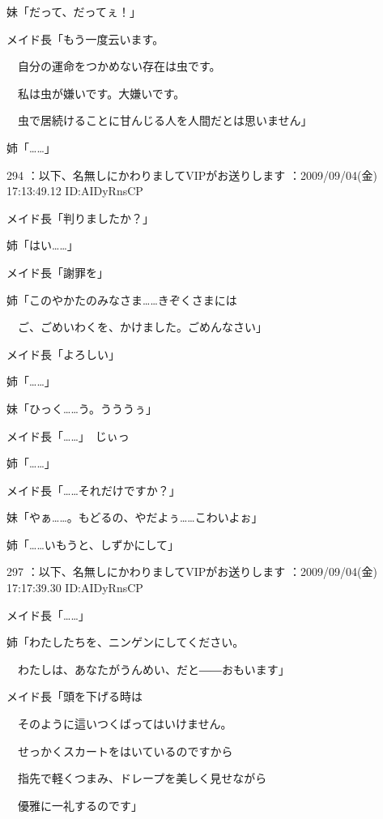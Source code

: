 \documentclass[a4j,twocolumn]{tarticle}
\begin{document}
妹「だって、だってぇ！」 



メイド長「もう一度云います。\par{} 
　自分の運命をつかめない存在は虫です。\par{} 
　私は虫が嫌いです。大嫌いです。\par{} 
　虫で居続けることに甘んじる人を人間だとは思いません」 



姉「……」 

	
    
    

294 ：以下、名無しにかわりましてVIPがお送りします ：2009/09/04(金) 17:13:49.12 ID:AIDyRnsCP 


メイド長「判りましたか？」\par{} 
姉「はい……」 



メイド長「謝罪を」 



姉「このやかたのみなさま……きぞくさまには\par{} 
　ご、ごめいわくを、かけました。ごめんなさい」 



メイド長「よろしい」 



姉「……」\par{} 
妹「ひっく……う。うううぅ」 



メイド長「……」　じぃっ\par{} 
姉「……」 



メイド長「……それだけですか？」 



妹「やぁ……。もどるの、やだよぅ……こわいよぉ」 



姉「……いもうと、しずかにして」 

	
    
    

297 ：以下、名無しにかわりましてVIPがお送りします ：2009/09/04(金) 17:17:39.30 ID:AIDyRnsCP 


メイド長「……」 



姉「わたしたちを、ニンゲンにしてください。\par{} 
　わたしは、あなたがうんめい、だと――おもいます」 



メイド長「頭を下げる時は\par{} 
　そのように這いつくばってはいけません。\par{} 
　せっかくスカートをはいているのですから\par{} 
　指先で軽くつまみ、ドレープを美しく見せながら\par{} 
　優雅に一礼するのです」 
\end{document}
